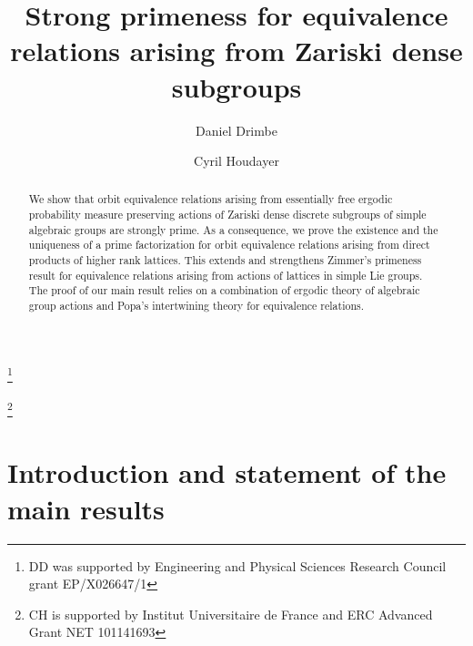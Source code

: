 \documentclass[11pt]{amsart}
\numberwithin{equation}{section}
\theoremstyle{plain}
\theoremstyle{definition}
\begin{document}
\title[Strong primeness for equivalence relations]{Strong primeness for equivalence relations arising from Zariski dense subgroups}


\begin{abstract}
We show that orbit equivalence relations arising from essentially free ergodic probability measure preserving actions of Zariski dense discrete subgroups of simple algebraic groups are strongly prime. As a consequence, we prove the existence and the uniqueness of a prime factorization for orbit equivalence relations arising from direct products of higher rank lattices. This extends and strengthens Zimmer's primeness result for equivalence relations arising from actions of lattices in simple Lie groups. The proof of our main result relies on a combination of ergodic theory of algebraic group actions and Popa's intertwining theory for equivalence relations.
\end{abstract}


\author{Daniel Drimbe}
\address{Department of Mathematics \\ University of Iowa \\
14 MacLean Hall \\ Iowa City 52242 \\ USA}
\thanks{DD was supported by Engineering and Physical Sciences Research Council grant EP/X026647/1}


\author{Cyril Houdayer}
\address{\'Ecole normale sup\'erieure \\ D\'epartement de math\'ematiques et applications \\ Universit\'e Paris-Saclay \\ 45 rue d'Ulm \\ 75230 Paris Cedex 05 \\ France}
\thanks{CH is supported by Institut Universitaire de France and ERC Advanced Grant NET 101141693}








\maketitle


\section{Introduction and statement of the main results}
\end{document}
